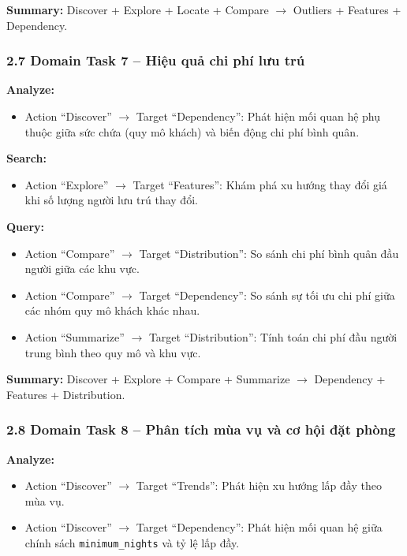 \textbf{Summary:} Discover + Explore + Locate + Compare $\rightarrow$ Outliers + Features + Dependency.

\subsubsection*{2.7 Domain Task 7 -- Hiệu quả chi phí lưu trú}

\textbf{Analyze:} 
\begin{itemize}
    \item Action ``Discover'' $\rightarrow$ Target ``Dependency'': Phát hiện mối quan hệ phụ thuộc giữa sức chứa (quy mô khách) và biến động chi phí bình quân.
\end{itemize}

\textbf{Search:} 
\begin{itemize}
    \item Action ``Explore'' $\rightarrow$ Target ``Features'': Khám phá xu hướng thay đổi giá khi số lượng người lưu trú thay đổi.
\end{itemize}

\textbf{Query:} 
\begin{itemize}
    \item Action ``Compare'' $\rightarrow$ Target ``Distribution'': So sánh chi phí bình quân đầu người giữa các khu vực. 
    \item Action ``Compare'' $\rightarrow$ Target ``Dependency'': So sánh sự tối ưu chi phí giữa các nhóm quy mô khách khác nhau. 
    \item Action ``Summarize'' $\rightarrow$ Target ``Distribution'': Tính toán chi phí đầu người trung bình theo quy mô và khu vực.
\end{itemize}

\textbf{Summary:} Discover + Explore + Compare + Summarize $\rightarrow$ Dependency + Features + Distribution.

\subsubsection*{2.8 Domain Task 8 -- Phân tích mùa vụ và cơ hội đặt phòng}

\textbf{Analyze:} 
\begin{itemize}
    \item Action ``Discover'' $\rightarrow$ Target ``Trends'': Phát hiện xu hướng lấp đầy theo mùa vụ. 
    \item Action ``Discover'' $\rightarrow$ Target ``Dependency'': Phát hiện mối quan hệ giữa chính sách \texttt{minimum\_nights} và tỷ lệ lấp đầy.
\end{itemize}

